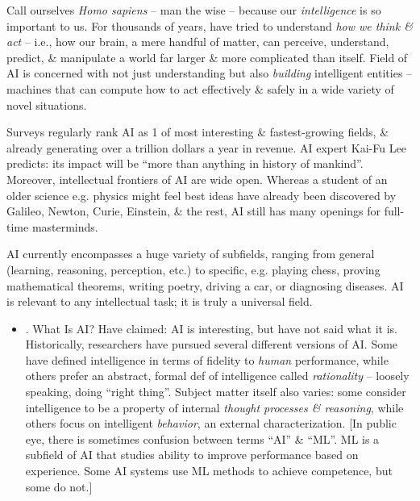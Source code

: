 \documentclass{article}
\begin{document}
\begin{itemize}
\begin{itemize}
		Call ourselves {\it Homo sapiens} -- man the wise -- because our {\it intelligence} is so important to us. For thousands of years, have tried to understand {\it how we think \& act} -- i.e., how our brain, a mere handful of matter, can perceive, understand, predict, \& manipulate a world far larger \& more complicated than itself. Field of AI is concerned with not just understanding but also {\it building} intelligent entities -- machines that can compute how to act effectively \& safely in a wide variety of novel situations.
		
		Surveys regularly rank AI as 1 of most interesting \& fastest-growing fields, \& already generating over a trillion dollars a year in revenue. AI expert {\sc Kai-Fu Lee} predicts: its impact will be ``more than anything in history of mankind''. Moreover, intellectual frontiers of AI are wide open. Whereas a student of an older science e.g. physics might feel best ideas have already been discovered by {\sc Galileo, Newton, Curie, Einstein}, \& the rest, AI still has many openings for full-time masterminds.
		
		AI currently encompasses a huge variety of subfields, ranging from general (learning, reasoning, perception, etc.) to specific, e.g. playing chess, proving mathematical theorems, writing poetry, driving a car, or diagnosing diseases. AI is relevant to any intellectual task; it is truly a universal field.
		\begin{itemize}
			\item {. What Is AI?} Have claimed: AI is interesting, but have not said what it is. Historically, researchers have pursued several different versions of AI. Some have defined intelligence in terms of fidelity to {\it human} performance, while others prefer an abstract, formal def of intelligence called {\it rationality} -- loosely speaking, doing ``right thing''. Subject matter itself also varies: some consider intelligence to be a property of internal {\it thought processes \& reasoning}, while others focus on intelligent {\it behavior}, an external characterization. [In public eye, there is sometimes confusion between terms ``AI'' \& ``ML''. ML is a subfield of AI that studies ability to improve performance based on experience. Some AI systems use ML methods to achieve competence, but some do not.]
			

\end{itemize}
\end{itemize}
\end{itemize}
\end{document}
